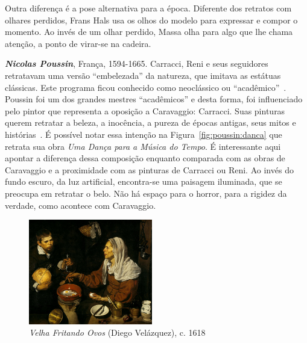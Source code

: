 Outra diferença é a pose alternativa para a época. Diferente dos
retratos com olhares perdidos, Frans Hals usa os olhos do modelo para
expressar e compor o momento. Ao invés de um olhar perdido, Massa olha
para algo que lhe chama atenção, a ponto de virar-se na cadeira.

\textbf{\emph{Nicolas Poussin}}, França, 1594-1665. Carracci, Reni e
seus seguidores retratavam uma versão ``embelezada'' da natureza, que
imitava as estátuas clássicas. Este programa ficou conhecido como
neoclássico ou ``acadêmico''~\cite{gombrich}. Poussin foi um dos
grandes mestres ``acadêmicos'' e desta forma, foi influenciado pelo
pintor que representa a oposição a Caravaggio: Carracci. Suas pinturas
querem retratar a beleza, a inocência, a pureza de épocas antigas,
seus mitos e histórias~\cite{unglaub}. É possível notar essa intenção
na Figura~\ref{fig:poussin:danca} que retrata sua obra \textit{Uma
  Dança para a Música do Tempo}. É interessante aqui apontar a
diferença dessa composição enquanto comparada com as obras de
Caravaggio e a proximidade com as pinturas de Carracci ou Reni. Ao
invés do fundo escuro, da luz artificial, encontra-se uma paisagem
iluminada, que se preocupa em retratar o belo. Não há espaço para o
horror, para a rigidez da verdade, como acontece com Caravaggio.


\begin{figure}
  \begin{center}
    \includegraphics[width=0.48\textwidth]{figs/velazquez_velha.png}
  \end{center}
  \caption{\emph{Velha Fritando Ovos} (Diego Velázquez), c. 1618}
  \label{fig:velazquez:velha}
\end{figure}


